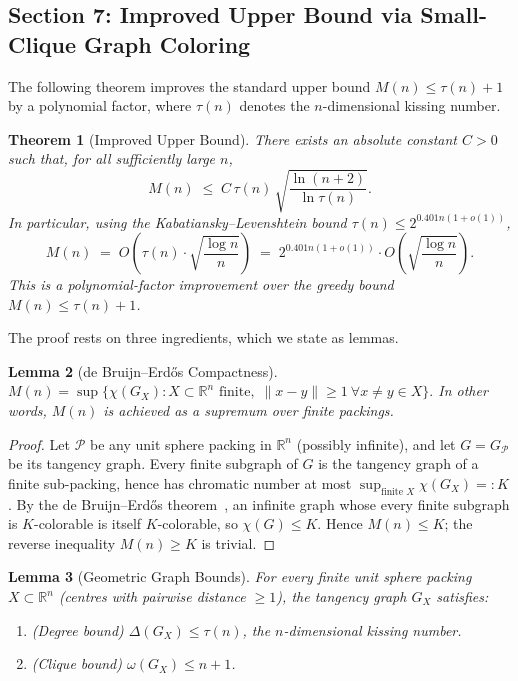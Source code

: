 \documentclass{article}
\newtheorem{theorem}{Theorem}[section]
\newtheorem{lemma}[theorem]{Lemma}
\theoremstyle{definition}
\begin{document}
\subsection*{Section 7: Improved Upper Bound via Small-Clique Graph Coloring}

The following theorem improves the standard upper bound $M(n)\le \tau(n)+1$ by a polynomial factor, where $\tau(n)$ denotes the $n$-dimensional kissing number.

\begin{theorem}[Improved Upper Bound]\label{thm:upper-bound}
There exists an absolute constant $C>0$ such that, for all sufficiently large $n$,
\[
  M(n) \;\le\; C\,\tau(n)\,\sqrt{\frac{\ln(n+2)}{\ln \tau(n)}}.
\]
In particular, using the Kabatiansky--Levenshtein bound $\tau(n)\le 2^{0.401n(1+o(1))}$,
\[
  M(n) \;=\; O\!\left(\tau(n)\cdot\sqrt{\frac{\log n}{n}}\right)
  \;=\; 2^{0.401n(1+o(1))}\cdot O\!\left(\sqrt{\frac{\log n}{n}}\right).
\]
This is a polynomial-factor improvement over the greedy bound $M(n)\le\tau(n)+1$.
\end{theorem}

The proof rests on three ingredients, which we state as lemmas.

\begin{lemma}[de Bruijn--Erd\H{o}s Compactness]\label{lem:compactness}
$M(n) = \sup\bigl\{\chi(G_X) : X\subset\mathbb{R}^n\text{ finite},\;\|x-y\|\ge 1\ \forall x\ne y\in X\bigr\}.$
In other words, $M(n)$ is achieved as a supremum over \emph{finite} packings.
\end{lemma}

\begin{proof}
Let $\mathcal{P}$ be any unit sphere packing in $\mathbb{R}^n$ (possibly infinite), and let $G=G_{\mathcal{P}}$ be its tangency graph.  Every finite subgraph of $G$ is the tangency graph of a finite sub-packing, hence has chromatic number at most $\sup_{\text{finite }X}\chi(G_X)=:K$.  By the de Bruijn--Erd\H{o}s theorem~\cite{dBE1951}, an infinite graph whose every finite subgraph is $K$-colorable is itself $K$-colorable, so $\chi(G)\le K$.  Hence $M(n)\le K$; the reverse inequality $M(n)\ge K$ is trivial.
\end{proof}

\begin{lemma}[Geometric Graph Bounds]\label{lem:graph-bounds}
For every finite unit sphere packing $X\subset\mathbb{R}^n$ (centres with pairwise distance $\ge 1$), the tangency graph $G_X$ satisfies:
\begin{enumerate}
  \item[\textup{(a)}] \textup{(Degree bound)} $\Delta(G_X)\le\tau(n)$, the $n$-dimensional kissing number.
  \item[\textup{(b)}] \textup{(Clique bound)} $\omega(G_X)\le n+1$.
\end{enumerate}
\end{lemma}
\end{document}
